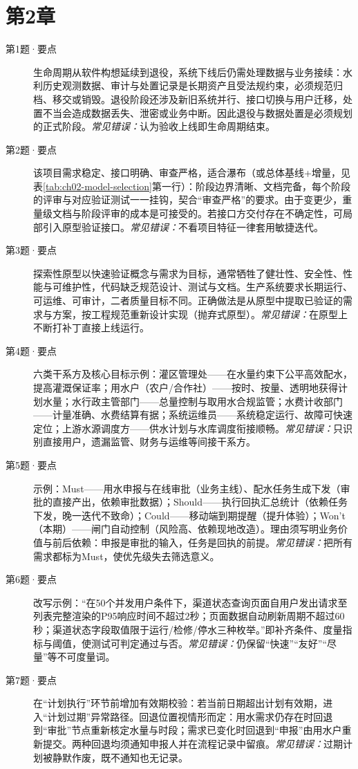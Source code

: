 \section{第2章}
\begin{description}
\item[第1题·要点] 生命周期从软件构想延续到退役，系统下线后仍需处理数据与业务接续：水利历史观测数据、审计与处置记录是长期资产且受法规约束，必须规范归档、移交或销毁。退役阶段还涉及新旧系统并行、接口切换与用户迁移，处置不当会造成数据丢失、泄密或业务中断。因此退役与数据处置是必须规划的正式阶段。\textit{常见错误：}认为验收上线即生命周期结束。
\item[第2题·要点] 该项目需求稳定、接口明确、审查严格，适合瀑布（或总体基线+增量，见表\ref{tab:ch02-model-selection}第一行）：阶段边界清晰、文档完备，每个阶段的评审与对应验证测试一一挂钩，契合“审查严格”的要求。由于变更少，重量级文档与阶段评审的成本是可接受的。若接口方交付存在不确定性，可局部引入原型验证接口。\textit{常见错误：}不看项目特征一律套用敏捷迭代。
\item[第3题·要点] 探索性原型以快速验证概念与需求为目标，通常牺牲了健壮性、安全性、性能与可维护性，代码缺乏规范设计、测试与文档。生产系统要求长期运行、可运维、可审计，二者质量目标不同。正确做法是从原型中提取已验证的需求与方案，按工程规范重新设计实现（抛弃式原型）。\textit{常见错误：}在原型上不断打补丁直接上线运行。
\item[第4题·要点] 六类干系方及核心目标示例：灌区管理处——在水量约束下公平高效配水，提高灌溉保证率；用水户（农户/合作社）——按时、按量、透明地获得计划水量；水行政主管部门——总量控制与取用水合规监管；水费计收部门——计量准确、水费结算有据；系统运维员——系统稳定运行、故障可快速定位；上游水源调度方——供水计划与水库调度衔接顺畅。\textit{常见错误：}只识别直接用户，遗漏监管、财务与运维等间接干系方。
\item[第5题·要点] 示例：Must——用水申报与在线审批（业务主线）、配水任务生成下发（审批的直接产出，依赖审批数据）；Should——执行回执汇总统计（依赖任务下发，晚一迭代不致命）；Could——移动端到期提醒（提升体验）；Won't（本期）——闸门自动控制（风险高、依赖现地改造）。理由须写明业务价值与前后依赖：申报是审批的输入，任务是回执的前提。\textit{常见错误：}把所有需求都标为Must，使优先级失去筛选意义。
\item[第6题·要点] 改写示例：“在50个并发用户条件下，渠道状态查询页面自用户发出请求至列表完整渲染的P95响应时间不超过$2$秒；页面数据自动刷新周期不超过$60$秒；渠道状态字段取值限于运行/检修/停水三种枚举。”即补齐条件、度量指标与阈值，使测试可判定通过与否。\textit{常见错误：}仍保留“快速”“友好”“尽量”等不可度量词。
\item[第7题·要点] 在“计划执行”环节前增加有效期校验：若当前日期超出计划有效期，进入“计划过期”异常路径。回退位置视情形而定：用水需求仍存在时回退到“审批”节点重新核定水量与时段；需求已变化时回退到“申报”由用水户重新提交。两种回退均须通知申报人并在流程记录中留痕。\textit{常见错误：}过期计划被静默作废，既不通知也无记录。

\end{description}
